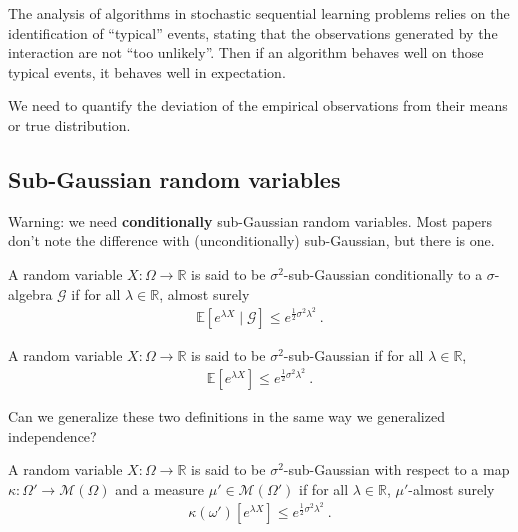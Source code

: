
The analysis of algorithms in stochastic sequential learning problems relies on the identification of ``typical'' events, stating that the observations generated by the interaction are not ``too unlikely''. Then if an algorithm behaves well on those typical events, it behaves well in expectation.

We need to quantify the deviation of the empirical observations from their means or true distribution.

\subsection{Sub-Gaussian random variables}
\label{sub:sub_gaussian_random_variables}

Warning: we need \textbf{conditionally} sub-Gaussian random variables. Most papers don't note the difference with (unconditionally) sub-Gaussian, but there is one.

\begin{definition}
A random variable $X : \Omega \to \mathbb{R}$ is said to be $\sigma^2$-sub-Gaussian conditionally to a $\sigma$-algebra $\mathcal G$ if for all $\lambda \in \mathbb{R}$, almost surely
\begin{align*}
\mathbb{E}[e^{\lambda X} \mid \mathcal G] \le e^{\frac{1}{2}\sigma^2\lambda^2} \: .
\end{align*}

A random variable $X : \Omega \to \mathbb{R}$ is said to be $\sigma^2$-sub-Gaussian if for all $\lambda \in \mathbb{R}$,
\begin{align*}
\mathbb{E}[e^{\lambda X}] \le e^{\frac{1}{2}\sigma^2\lambda^2} \: .
\end{align*}
\end{definition}

Can we generalize these two definitions in the same way we generalized independence?

\begin{definition}
A random variable $X : \Omega \to \mathbb{R}$ is said to be $\sigma^2$-sub-Gaussian with respect to a map $\kappa : \Omega' \to \mathcal M(\Omega)$ and a measure $\mu' \in \mathcal M(\Omega')$ if for all $\lambda \in \mathbb{R}$, $\mu'$-almost surely
\begin{align*}
\kappa(\omega')[e^{\lambda X}] \le e^{\frac{1}{2}\sigma^2\lambda^2} \: .
\end{align*}
\end{definition}

